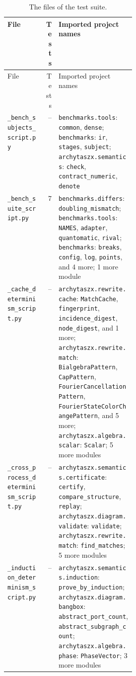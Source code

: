 \begin{xltabular}{\linewidth}{@{}>{\raggedright\arraybackslash}p{0.3\linewidth}r>{\raggedright\arraybackslash}X@{}}
\caption{The files of the test suite.}\label{tab:dev-tests}\\
\toprule
File & Tests & Imported project names \\
\midrule
\endfirsthead
\toprule
File & Tests & Imported project names \\
\midrule
\endhead
\bottomrule
\endfoot
\texttt{\_\allowbreak{}bench\_\allowbreak{}subjects\_\allowbreak{}script.py} & -- & \texttt{benchmarks.\allowbreak{}tools}: \texttt{common}, \texttt{dense}; \texttt{benchmarks}: \texttt{ir}, \texttt{stages}, \texttt{subject}; \texttt{archytaszx.\allowbreak{}semantics}: \texttt{check}, \texttt{contract\_\allowbreak{}numeric}, \texttt{denote} \\
\texttt{\_\allowbreak{}bench\_\allowbreak{}suite\_\allowbreak{}script.py} & 7 & \texttt{benchmarks.\allowbreak{}differs}: \texttt{doubling\_\allowbreak{}mismatch}; \texttt{benchmarks.\allowbreak{}tools}: \texttt{NAMES}, \texttt{adapter}, \texttt{quantomatic}, \texttt{rival}; \texttt{benchmarks}: \texttt{breaks}, \texttt{config}, \texttt{log}, \texttt{points}, and 4 more; 1 more module \\
\texttt{\_\allowbreak{}cache\_\allowbreak{}determinism\_\allowbreak{}script.py} & -- & \texttt{archytaszx.\allowbreak{}rewrite.\allowbreak{}cache}: \texttt{MatchCache}, \texttt{fingerprint}, \texttt{incidence\_\allowbreak{}digest}, \texttt{node\_\allowbreak{}digest}, and 1 more; \texttt{archytaszx.\allowbreak{}rewrite.\allowbreak{}match}: \texttt{BialgebraPattern}, \texttt{CapPattern}, \texttt{FourierCancellationPattern}, \texttt{FourierStateColorChangePattern}, and 5 more; \texttt{archytaszx.\allowbreak{}algebra.\allowbreak{}scalar}: \texttt{Scalar}; 5 more modules \\
\texttt{\_\allowbreak{}cross\_\allowbreak{}process\_\allowbreak{}determinism\_\allowbreak{}script.py} & -- & \texttt{archytaszx.\allowbreak{}semantics.\allowbreak{}certificate}: \texttt{certify}, \texttt{compare\_\allowbreak{}structure}, \texttt{replay}; \texttt{archytaszx.\allowbreak{}diagram.\allowbreak{}validate}: \texttt{validate}; \texttt{archytaszx.\allowbreak{}rewrite.\allowbreak{}match}: \texttt{find\_\allowbreak{}matches}; 5 more modules \\
\texttt{\_\allowbreak{}induction\_\allowbreak{}determinism\_\allowbreak{}script.py} & -- & \texttt{archytaszx.\allowbreak{}semantics.\allowbreak{}induction}: \texttt{prove\_\allowbreak{}by\_\allowbreak{}induction}; \texttt{archytaszx.\allowbreak{}diagram.\allowbreak{}bangbox}: \texttt{abstract\_\allowbreak{}port\_\allowbreak{}count}, \texttt{abstract\_\allowbreak{}subgraph\_\allowbreak{}count}; \texttt{archytaszx.\allowbreak{}algebra.\allowbreak{}phase}: \texttt{PhaseVector}; 3 more modules \\

\end{xltabular}
